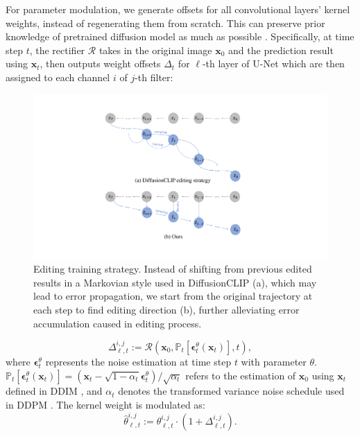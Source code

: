 \documentclass[letterpaper]{article} %
\begin{document}
For parameter modulation, we generate offsets for all convolutional layers' kernel weights, instead of regenerating them from scratch. This can preserve prior knowledge of pretrained diffusion model as much as possible \cite{alaluf2022hyperstyle}. Specifically, at time step $t$, the rectifier $\bm{\mathcal{R}}$ takes in the original image $\bm{x}_{0}$ and the prediction result using $\bm{x}_{t}$, then outputs weight offsets $\Delta_{t}$ for $\ell$-th layer of U-Net which are then assigned to each channel $i$ of $j$-th filter:
\begin{figure}[t]
    \centering
    \includegraphics[width=1\columnwidth]{Figs/fig3.pdf}
    \caption{Editing training strategy. Instead of shifting from previous edited results in a Markovian style used in DiffusionCLIP (a), which may lead to error propagation, we start from the original trajectory at each step to find editing direction (b), further alleviating error accumulation caused in editing process.}
    \label{fig3}
\end{figure}

\begin{equation}
    \Delta_{\ell,t}^{i,j} := \bm{\mathcal{R}}(\bm{x}_{0}, \mathbb{P}_t[\bm{\epsilon}_t^\theta(\bm{x}_t)], t),
\end{equation}
where $\bm{\epsilon}_t^\theta$ represents the noise estimation at time step $t$ with parameter $\theta$. $\mathbb{P}_t[\bm{\epsilon}_t^\theta(\bm{x}_t)]=(\bm{x}_t-\sqrt{1-\alpha_t}\bm{\epsilon}_t^\theta)/\sqrt{\alpha_t}$ refers to the estimation of $\bm{x}_0$ using $\bm{x}_t$ defined in DDIM \cite{song2020denoising}, and $\alpha_t$ denotes the transformed variance noise schedule used in DDPM \cite{ho2020denoising}. 
The kernel weight is modulated as:
\begin{equation}
    \hat{\theta}_{\ell,t}^{i,j} := \theta_{\ell,t}^{i,j} \cdot (1+\Delta_{\ell,t}^{i,j}).
\end{equation}
\end{document}
